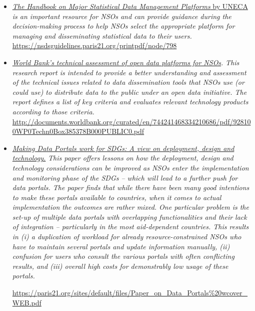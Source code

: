 \documentclass[
]{article}
\begin{document}
\begin{itemize}
\item
  \href{https://nsdsguidelines.paris21.org/printpdf/node/798}{\emph{The Handbook on Major Statistical Data Management Platforms} by
  UNECA} \emph{is an
  important resource for NSOs and can provide guidance during the
  decision-making process to help NSOs select the appropriate platform
  for managing and disseminating statistical data to their users.}
  \url{https://nsdsguidelines.paris21.org/printpdf/node/798}
\item
  \emph{\href{http://documents.worldbank.org/curated/en/744241468334210686/pdf/928100WP0Techn0Box385378B000PUBLIC0.pdf}{World Bank's technical assessment of open data platforms for
  NSOs}.}
  \emph{This research report is intended to provide a better understanding
  and assessment of the technical issues related to data dissemination
  tools that NSOs use (or could use) to distribute data to the public
  under an open data initiative. The report defines a list of key
  criteria and evaluates relevant technology products according to
  those criteria.}
  \url{http://documents.worldbank.org/curated/en/744241468334210686/pdf/928100WP0Techn0Box385378B000PUBLIC0.pdf}
  {}
\item
  \href{https://paris21.org/sites/default/files/Paper_on_Data_Portals\%20wcover_WEB.pdf}{\emph{Making Data Portals work for SDGs: A view on deployment, design
  and
  technology.}}
  \emph{This paper offers lessons on how the deployment, design and
  technology considerations can be improved as NSOs enter the
  implementation and monitoring phase of the SDGs -- which will lead
  to a further push for data portals. The paper finds that while there
  have been many good intentions to make these portals available to
  countries, when it comes to actual implementation the outcomes are
  rather mixed. One particular problem is the set-up of multiple data
  portals with overlapping functionalities and their lack of
  integration -- particularly in the most aid-dependent countries.
  This results in (i) a duplication of workload for already
  resource-constrained NSOs who have to maintain several portals and
  update information manually, (ii) confusion for users who consult
  the various portals with often conflicting results, and (iii)
  overall high costs for demonstrably low usage of these portals.}

  \url{https://paris21.org/sites/default/files/Paper_on_Data_Portals\%20wcover_WEB.pdf}
\end{itemize}
\end{document}

